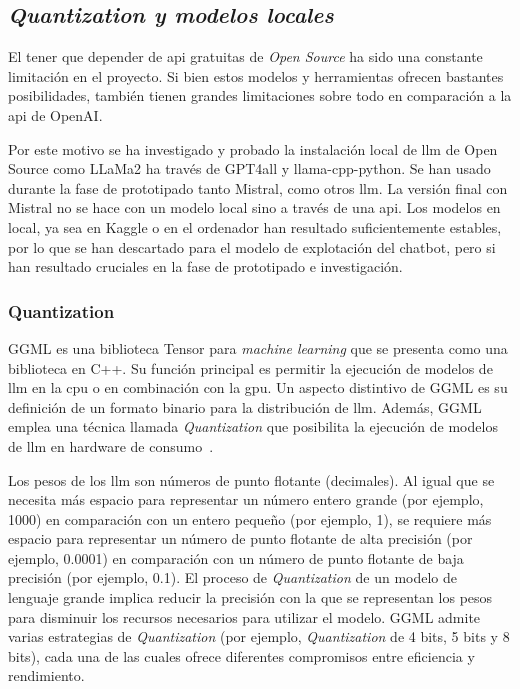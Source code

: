 \subsection{\textit{Quantization y modelos locales}}

El tener que depender de \acrshort{api} gratuitas de \textit{Open Source} ha sido una constante limitación en el proyecto. Si bien estos modelos y herramientas ofrecen bastantes posibilidades, también tienen grandes limitaciones sobre todo en comparación a la \acrshort{api} de OpenAI.

Por este motivo se ha investigado y probado la instalación local de \acrshort{llm} de Open Source como LLaMa2 ha través de GPT4all y llama-cpp-python. Se han usado durante la fase de prototipado tanto Mistral, como otros \acrshort{llm}. La versión final con Mistral no se hace con un modelo local sino a través de una \acrshort{api}. Los modelos en local, ya sea en Kaggle o en el ordenador han resultado suficientemente estables, por lo que se han descartado para el modelo de explotación del chatbot, pero si han resultado cruciales en la fase de prototipado e investigación.

\subsubsection{Quantization}

GGML es una biblioteca Tensor para \textit{machine learning} que se presenta como una biblioteca en C++. Su función principal es permitir la ejecución de modelos de \acrlong{llm} en la \acrshort{cpu} o en combinación con la \acrshort{gpu}. Un aspecto distintivo de GGML es su definición de un formato binario para la distribución de \acrshort{llm}. Además, GGML emplea una técnica llamada \textit{Quantization} que posibilita la ejecución de modelos de \acrshort{llm} en hardware de consumo~\cite{GGML_Gimmi}.

Los pesos de los \acrshort{llm} son números de punto flotante (decimales). Al igual que se necesita más espacio para representar un número entero grande (por ejemplo, 1000) en comparación con un entero pequeño (por ejemplo, 1), se requiere más espacio para representar un número de punto flotante de alta precisión (por ejemplo, 0.0001) en comparación con un número de punto flotante de baja precisión (por ejemplo, 0.1). El proceso de \textit{Quantization} de un modelo de lenguaje grande implica reducir la precisión con la que se representan los pesos para disminuir los recursos necesarios para utilizar el modelo. GGML admite varias estrategias de \textit{Quantization} (por ejemplo, \textit{Quantization} de 4 bits, 5 bits y 8 bits), cada una de las cuales ofrece diferentes compromisos entre eficiencia y rendimiento.

